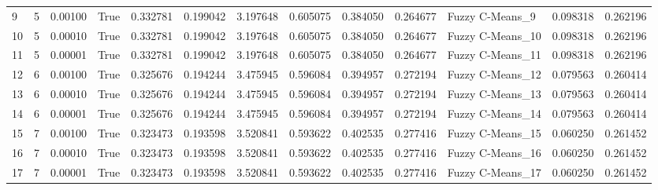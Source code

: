 \begin{tabular}{llrlrrrrrrlrr}
9  &          5 &    0.00100 &  True &             0.332781 &            0.199042 &              3.197648 &               0.605075 &           0.384050 &           0.264677 &   Fuzzy C-Means\_9 &          0.098318 &         0.262196 \\
10 &          5 &    0.00010 &  True &             0.332781 &            0.199042 &              3.197648 &               0.605075 &           0.384050 &           0.264677 &  Fuzzy C-Means\_10 &          0.098318 &         0.262196 \\
11 &          5 &    0.00001 &  True &             0.332781 &            0.199042 &              3.197648 &               0.605075 &           0.384050 &           0.264677 &  Fuzzy C-Means\_11 &          0.098318 &         0.262196 \\
12 &          6 &    0.00100 &  True &             0.325676 &            0.194244 &              3.475945 &               0.596084 &           0.394957 &           0.272194 &  Fuzzy C-Means\_12 &          0.079563 &         0.260414 \\
13 &          6 &    0.00010 &  True &             0.325676 &            0.194244 &              3.475945 &               0.596084 &           0.394957 &           0.272194 &  Fuzzy C-Means\_13 &          0.079563 &         0.260414 \\
14 &          6 &    0.00001 &  True &             0.325676 &            0.194244 &              3.475945 &               0.596084 &           0.394957 &           0.272194 &  Fuzzy C-Means\_14 &          0.079563 &         0.260414 \\
15 &          7 &    0.00100 &  True &             0.323473 &            0.193598 &              3.520841 &               0.593622 &           0.402535 &           0.277416 &  Fuzzy C-Means\_15 &          0.060250 &         0.261452 \\
16 &          7 &    0.00010 &  True &             0.323473 &            0.193598 &              3.520841 &               0.593622 &           0.402535 &           0.277416 &  Fuzzy C-Means\_16 &          0.060250 &         0.261452 \\
17 &          7 &    0.00001 &  True &             0.323473 &            0.193598 &              3.520841 &               0.593622 &           0.402535 &           0.277416 &  Fuzzy C-Means\_17 &          0.060250 &         0.261452 \\
\bottomrule
\end{tabular}
